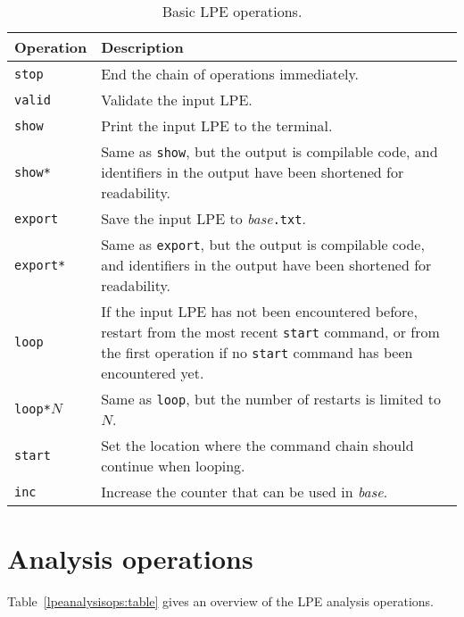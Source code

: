 \begin{table}[!ht]
\begin{center}
\begin{tabularx}{\linewidth}{l|X|}
\textbf{Operation} & \textbf{Description} \\ \hline
\texttt{stop} & End the chain of operations immediately. \\ \hline
\texttt{valid} & Validate the input LPE. \\ \hline
\texttt{show} & Print the input LPE to the terminal. \\ \hline
\texttt{show*} & Same as \texttt{show}, but the output is compilable \txs{} code, and identifiers in the output have been shortened for readability. \\ \hline
\texttt{export} & Save the input LPE to \textit{base}\texttt{.txt}. \\ \hline
\texttt{export*} & Same as \texttt{export}, but the output is compilable \txs{} code, and identifiers in the output have been shortened for readability. \\ \hline
\texttt{loop} & If the input LPE has not been encountered before, restart from the most recent \texttt{start} command, or from the first operation if no \texttt{start} command has been encountered yet. \\ \hline
\texttt{loop*}$N$ & Same as \texttt{loop}, but the number of restarts is limited to $N$. \\ \hline
\texttt{start} & Set the location where the command chain should continue when looping. \\ \hline
\texttt{inc} & Increase the counter that can be used in \textit{base}. \\ \hline
\end{tabularx}
\caption{Basic LPE operations.}
\label{basiclpeops:table}
\end{center}
\end{table}

\section{Analysis operations}

Table~\ref{lpeanalysisops:table} gives an overview of the LPE analysis operations.

